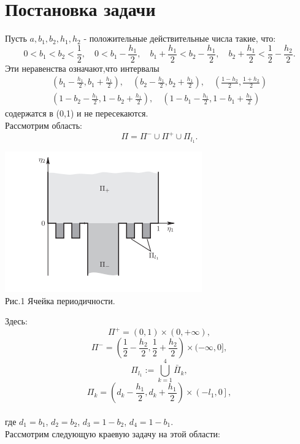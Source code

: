 \documentclass[12pt,titlepage]{report}
\begin{document}
\section{Постановка задачи}
Пусть $a, b_{1}, b_{2}, h_{1}, h_{2}$ - положительные действительные числа такие, что:
$$0<b_{1}<b_{2}<\frac{1}{2}, \quad 0<b_{1}-\frac{h_{1}}{2}, \quad b_{1}+\frac{h_{1}}{2}<b_{2}-\frac{h_{1}}{2}, \quad b_{2}+\frac{h_{1}}{2}<\frac{1}{2}-\frac{h_{2}}{2}.$$
Эти неравенства означают,что интервалы
$$\begin{array}{c}
\left(b_{1}-\frac{h_{1}}{2}, b_{1}+\frac{h_{1}}{2}\right), \quad\left(b_{2}-\frac{h_{1}}{2}, b_{2}+\frac{h_{1}}{2}\right), \quad\left(\frac{1-h_{2}}{2}, \frac{1+h_{2}}{2}\right) \\
\left(1-b_{2}-\frac{h_{1}}{2}, 1-b_{2}+\frac{h_{1}}{2}\right), \quad\left(1-b_{1}-\frac{h_{1}}{2}, 1-b_{1}+\frac{h_{1}}{2}\right)
\end{array}$$
содержатся в (0,1) и не пересекаются. \\
Рассмотрим область:
	$$\Pi=\Pi^{-} \cup \Pi^{+} \cup \Pi_{l_{1}}.$$
\begin{center}
		\includegraphics[scale=1.5]{kursac1.png}\\
	Рис.1 Ячейка периодичности.
\end{center}

Здесь: $$\Pi^{+}=(0,1) \times(0,+\infty),$$
$$\Pi^{-}=\left(\frac{1}{2}-\frac{h_{2}}{2}, \frac{1}{2}+\frac{h_{2}}{2}\right) \times(-\infty, 0],$$ $$\Pi_{l_{1}}:=\bigcup_{k=1}^{4} \bar{\Pi}_{k},$$  $$\Pi_{k}=\left(d_{k}-\frac{h_{1}}{2}, d_{k}+\frac{h_{1}}{2}\right) \times\left(-l_{1}, 0\right],$$ \\
где $d_{1}=b_{1}$, $d_{2}=b_{2}$, $d_{3}=1-b_{2}$, $d_{4}=1-b_{1}$.
\\
Рассмотрим следующую краевую задачу на этой области:
\end{document}
